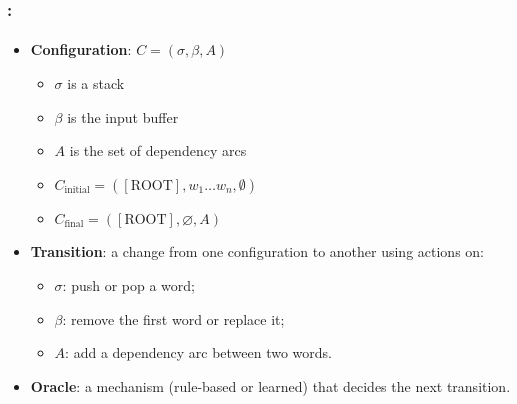 \documentclass[xcolor=table]{beamer}
\begin{document}
\begin{frame}
	\frametitle{\insertshortsubtitle: \insertsection}
	\framesubtitle{\insertsubsection}

	\begin{minipage}{.6\textwidth}
		\begin{itemize}
			\item \textbf{Configuration}:  $C = (\sigma, \beta, A)$
			\begin{itemize}
				\item $\sigma$ is a stack
				\item $\beta$ is the input buffer
				\item $A$ is the set of dependency arcs
				\item $C_{\text{initial}} = ([\text{ROOT}], w_1 \ldots w_n, \emptyset)$
				\item $C_{\text{final}} = ([\text{ROOT}], \varnothing, A)$
			\end{itemize}
		\end{itemize}
	\end{minipage}
	\begin{minipage}{.38\textwidth}
	\end{minipage}
	
	\begin{itemize}
		\item \textbf{Transition}: a change from one configuration to another using actions on:
		\begin{itemize}
			\item $\sigma$: push or pop a word;
			\item $\beta$: remove the first word or replace it;
			\item $A$: add a dependency arc between two words.
		\end{itemize}
		\item \textbf{Oracle}: a mechanism (rule-based or learned) that decides the next transition.
	\end{itemize}

\end{frame}
\end{document}
